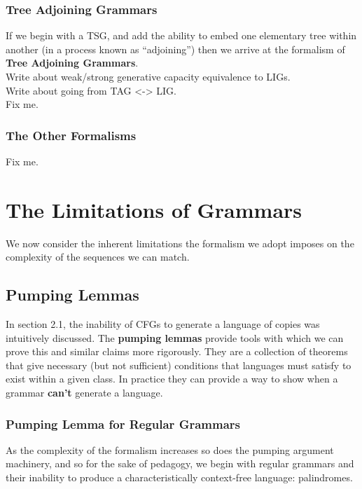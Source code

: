 \documentclass[11pt]{article}
\begin{document}
\subsubsection {Tree Adjoining Grammars}
If we begin with a TSG, and add the ability to embed one elementary tree within another (in a process known as ``adjoining'') then we
arrive at the formalism of {\bf Tree Adjoining Grammars}.\\
Write about weak/strong generative capacity equivalence to LIGs.\\
Write about going from TAG <-> LIG.\\
Fix me.

\subsubsection {The Other Formalisms}
Fix me.

\section {The Limitations of Grammars}
We now consider the inherent limitations the formalism we adopt imposes on the complexity of the sequences we can match.
\subsection {Pumping Lemmas}
In section 2.1, the inability of CFGs to generate a language of copies was intuitively discussed.
The {\bf pumping lemmas} provide tools with which we can prove this and similar claims more rigorously.
They are a collection of theorems that give necessary (but not sufficient) conditions that languages must satisfy to exist within
a given class. In practice they can provide a way to show when a grammar {\bf can't} generate a language.

\subsubsection {Pumping Lemma for Regular Grammars}
As the complexity of the formalism increases so does the pumping argument machinery, and so
for the sake of pedagogy, we begin with regular grammars and their inability to produce a characteristically
context-free language: palindromes.
\end{document}
